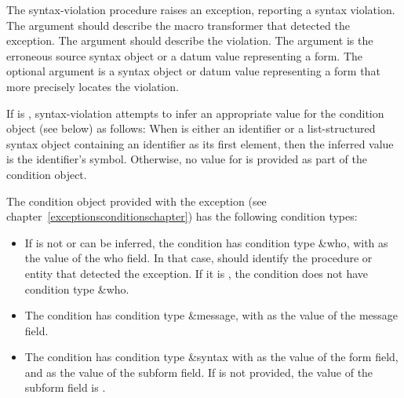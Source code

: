 \begin{entry}{%
}

The {\cf syntax-violation} procedure raises an exception, reporting 
a syntax violation.  
The  argument should describe the macro transformer that
detected the exception.  The  argument should describe
the violation.
The  argument is the erroneous source syntax
object or a datum value representing a form. The optional  argument is a syntax
object or datum value representing a form that more precisely locates the
violation.

If  is \schfalse{}, {\cf syntax-violation} attempts to
infer an appropriate value for the condition object (see below) as
follows:  When  is either an identifier or a
list-structured syntax object containing an identifier as its first element, then
the inferred value is the identifier's symbol.
Otherwise, no value for  is provided as part of the
condition object.

The condition object provided with the exception (see
chapter~\ref{exceptionsconditionschapter}) has the following condition types:
%
\begin{itemize}
\item If  is not \schfalse{} or can be inferred, the condition has condition type
  {\cf \&who}, with  as the value of the {\cf who} field.  In
  that case,  should identify the procedure or entity that
  detected the exception.  If it is \schfalse, the condition does not
  have condition type {\cf \&who}.
\item The condition has condition type {\cf \&message}, with
   as the value of the {\cf message} field.
\item The condition has condition type {\cf \&syntax} 
  with  as the value of the {\cf form} field,
  and  as the value of the {\cf subform} field.
  If  is not provided, the value of the {\cf subform}
  field is \schfalse.
\end{itemize}
\end{entry}

